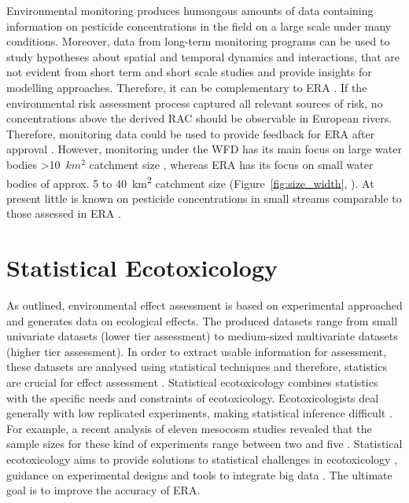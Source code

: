 Environmental monitoring produces humongous amounts of data containing information on pesticide concentrations in the field on a large scale under many conditions.
Moreover, data from long-term monitoring programs can be used to study hypotheses about spatial and temporal dynamics and interactions, that are not evident from short term and short scale studies \citep{gitzen_design_2012} and provide insights for modelling approaches. 
Therefore, it can be complementary to ERA \citep{suter_ecological_2007}.
If the environmental risk assessment process captured all relevant sources of risk, no concentrations above the derived RAC should be observable in European rivers. 
Therefore, monitoring data could be used to provide feedback for ERA after approval \citep{knauer_pesticides_2016}. 
However, monitoring under the WFD has its main focus on large water bodies \textgreater 10~$km^2$ catchment size \citep{european_union_directive_2000}, whereas ERA has its focus on small water bodies of approx. 5 to 40~km\textsuperscript{2} catchment size (Figure~\ref{fig:size_width}, \citet{european_union_regulation_2009, brock_aquatic_2006}).
At present little is known on pesticide concentrations in small streams comparable to those assessed in ERA \citep{lorenz_specifics_2016, biggs_importance_2016}. 



\section{Statistical Ecotoxicology}

As outlined, environmental effect assessment is based on experimental approached and generates data on ecological effects.
The produced datasets range from small univariate datasets (lower tier assessment) to medium-sized multivariate datasets (higher tier assessment).
In order to extract usable information for assessment, these datasets are analysed using statistical techniques and therefore, statistics are crucial for effect assessment \citep{newman_quantitative_2012}.
Statistical ecotoxicology combines statistics with the specific needs and constraints of ecotoxicology. 
Ecotoxicologists deal generally with low replicated experiments, making statistical inference difficult \citep{van_der_hoeven_power_1998}.
For example, a recent analysis of eleven mesocosm studies revealed that the sample sizes for these kind of experiments range between two and five \citep{szocs_analysing_2015}.
Statistical ecotoxicology aims to provide solutions to statistical challenges in ecotoxicology \citep{fox_comment_2016}, guidance on experimental designs \citep{johnson_power_2015} and tools to integrate big data \citep {van_den_brink_new_2016}.
The ultimate goal is to improve the accuracy of ERA. 

